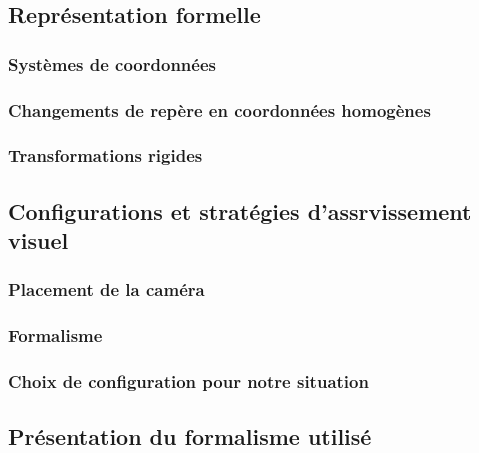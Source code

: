  \subsection{Représentation formelle}
 
 \subsubsection{Systèmes de coordonnées}
 
 \subsubsection{Changements de repère en coordonnées homogènes}
 
 \subsubsection{Transformations rigides}
 
 \subsection{Configurations et stratégies d'assrvissement visuel}
 
 \subsubsection{Placement de la caméra}
 
 \subsubsection{Formalisme}
 
 \subsubsection{Choix de configuration pour notre situation}
 
 \subsection{Présentation du formalisme utilisé}
 

 
 
 
 
 
 
 
 


